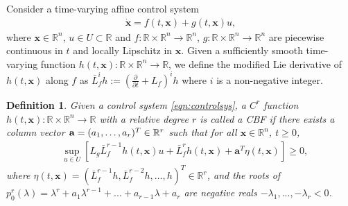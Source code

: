 \documentclass[journal,10pt]{IEEEtran}
\newtheorem{definition}{\bfseries Definition}%
\newcommand{\vect}[1]{\boldsymbol{\mathbf{#1}}}
\newcommand{\R}{\mathbb{R}}
\newcommand{\la}{\lambda}
\newcommand*\diff{\mathop{}\!\mathrm{d}}
\newcommand{\pa}{\partial}
\begin{document}

Consider a time-varying affine control system
\begin{align}\label{eqn:controlsys}
\dot{\vect{x}} = f(t,\vect{x}) + g(t,\vect{x})u,
\end{align}
where $\vect{x} \in \R^n$, $u \in U\subset \R$ and $f:\R\times \R^n \to \R^n$, $g:\R\times \R^n \to \R^n$ are piecewise continuous in $t$ and locally Lipschitz in $\vect{x}$. 
Given a sufficiently smooth time-varying function $h(t,\vect{x}):\R\times \R^n \to \R$, we define the modified Lie derivative of $h(t,\vect{x})$ along $f$ as $\bar L_f^ih:=(\frac{\pa }{\pa t}+L_f)^ih$  where $i$ is a non-negative integer. 

\begin{definition}\cite{xu2018constrained}\label{dfn:cbfhigh}
Given a control system \eqref{eqn:controlsys}, a $C^r$ function $h(t,\vect{x}): \R\times \R^n \to \R$ with a relative degree $r$ is called a CBF if  there exists a column vector ${\bf a}=(a_1,\ldots,a_r)^T\in\R^r$ such that for all $\vect{x}\in\R^n$, $t\geq 0$,
\begin{align}\label{ineq:ZCBF2}
	& \sup_{u \in U}  [L_g\bar L_f^{r-1}h(t,\vect{x})u +\bar L_f^rh(t,\vect{x})+{\vect{a}}^T\eta(t,\vect{x}) ] \geq 0,
\end{align}
where $\eta(t,\vect{x})=(\bar L_f^{r-1}h,\bar L_f^{r-2}h,\ldots,h)^T\in\R^r$, and the roots of $p_0^r(\la)=\la^r+a_1\la^{r-1}+...+a_{r-1}\la+a_r$ are negative reals $-\la_1,...,-\la_r<0$.
\end{definition}
\end{document}
